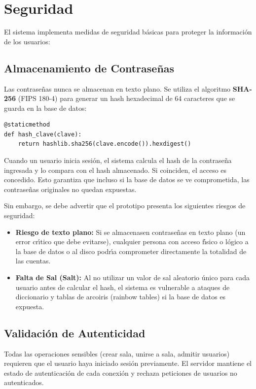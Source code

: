 \documentclass[12pt,a4paper]{article}
\begin{document}
\section{Seguridad}

El sistema implementa medidas de seguridad b\'asicas para proteger la informaci\'on de los usuarios:

\subsection{Almacenamiento de Contrase\~nas}

Las contrase\~nas nunca se almacenan en texto plano. Se utiliza el algoritmo \textbf{SHA-256} (FIPS 180-4) para generar un hash hexadecimal de 64 caracteres que se guarda en la base de datos:

\begin{lstlisting}
@staticmethod
def hash_clave(clave):
    return hashlib.sha256(clave.encode()).hexdigest()
\end{lstlisting}

Cuando un usuario inicia sesi\'on, el sistema calcula el hash de la contrase\~na ingresada y lo compara con el hash almacenado. Si coinciden, el acceso es concedido. Esto garantiza que incluso si la base de datos se ve comprometida, las contrase\~nas originales no quedan expuestas.

Sin embargo, se debe advertir que el prototipo presenta los siguientes riesgos de seguridad:
\begin{itemize}
    \item \textbf{Riesgo de texto plano:} Si se almacenasen contrase\~nas en texto plano (un error cr\'{\i}tico que debe evitarse), cualquier persona con acceso f\'{\i}sico o l\'ogico a la base de datos o al disco podr\'{\i}a comprometer directamente la totalidad de las cuentas.
    \item \textbf{Falta de Sal (Salt):} Al no utilizar un valor de sal aleatorio \'unico para cada usuario antes de calcular el hash, el sistema es vulnerable a ataques de diccionario y tablas de arcoiris (rainbow tables) si la base de datos es expuesta.
\end{itemize}


\subsection{Validaci\'on de Autenticidad}

Todas las operaciones sensibles (crear sala, unirse a sala, admitir usuarios) requieren que el usuario haya iniciado sesi\'on previamente. El servidor mantiene el estado de autenticaci\'on de cada conexi\'on y rechaza peticiones de usuarios no autenticados.
\end{document}
